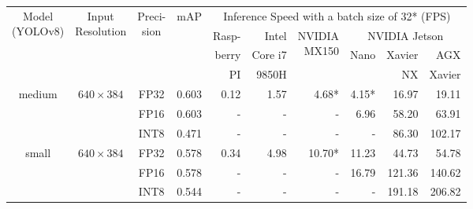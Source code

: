 \begin{appendices}
\begin{table}
    \footnotesize
    \centering
    \begin{tabular}{|c|c|c|c|rrrrrr|}
        \hline
        \multirow{4}{*}{\parbox{1.6cm}{\centering Model\\(YOLOv8)}} &
          \multirow{4}{*}{\parbox{1.5cm}{\centering Input\\Resolution}} &
            \multirow{4}{*}{\parbox{0.9cm}{\centering Preci-\\sion}} &
              \multirow{4}{*}{mAP} &
                \multicolumn{6}{c|}{Inference Speed with a batch size of 32* (FPS)} \\
        \cline{5-10}
        & & & & Rasp- & Intel   &\multirow{3}{*}{\parbox{1.2cm}{\raggedleft NVIDIA\\MX150}} & \multicolumn{3}{|c|}{NVIDIA Jetson} \\
        \cline{8-10}
        & & & & berry & Core i7 &                                                           & \multicolumn{1}{|c}{\multirow{2}{*}{Nano}} & Xavier & AGX \\
        & & & & PI    & 9850H   &                                                           & \multicolumn{1}{|c}{}                      & NX     & Xavier \\
        \hline
        \hline
        \multirow{3}{*}{medium}                                   & \multirow{3}{*}{$640 \times 384$} & FP32 & 0.603 & 0.12  &   1.57 &  4.68* &  4.15* &   16.97 &   19.11 \\
                                                                  &                                   & FP16 & 0.603 &    -  &      - &      - &   6.96 &   58.20 &   63.91 \\
                                                                  &                                   & INT8 & 0.471 &    -  &      - &      - &      - &   86.30 &  102.17 \\
        \hline
        \multirow{3}{*}{small}                                    & \multirow{3}{*}{$640 \times 384$} & FP32 & 0.578 & 0.34  &   4.98 & 10.70* &  11.23 &   44.73 &   54.78 \\
                                                                  &                                   & FP16 & 0.578 &    -  &      - &      - &  16.79 &  121.36 &  140.62 \\
                                                                  &                                   & INT8 & 0.544 &    -  &      - &      - &      - &  191.18 &  206.82 \\

\end{tabular}
\end{table}
\end{appendices}
